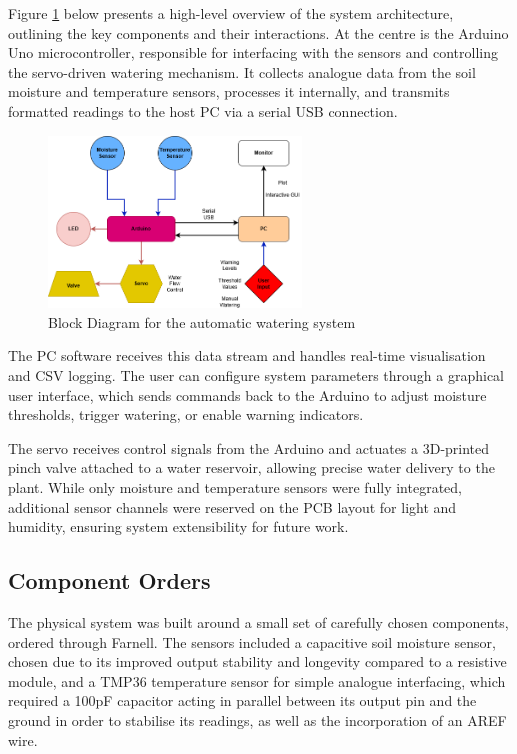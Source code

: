 \documentclass[a4paper,11pt]{article}
\begin{document}
Figure \ref{fig:Block_Diagram_for_the_automatic_watering_system} below presents a high-level overview 
of the system architecture, outlining the key components and their interactions. 
At the centre is the Arduino Uno microcontroller, responsible for interfacing with 
the sensors and controlling the servo-driven watering mechanism. 
It collects analogue data from the soil moisture and temperature sensors, 
processes it internally, and transmits formatted readings 
to the host PC via a serial USB connection.

\begin{figure}[H]
    \centering
    \includegraphics[width=0.6\textwidth]{Datalogger Block Diagram - final.png}
    \caption{Block Diagram for the automatic watering system}
    \label{fig:Block_Diagram_for_the_automatic_watering_system}
\end{figure}

The PC software receives this data stream and handles real-time visualisation
and CSV logging.
The user can configure system parameters through a graphical user interface, 
which sends commands back to the Arduino to adjust moisture thresholds, 
trigger watering, or enable warning indicators.

The servo receives control signals from the Arduino and 
actuates a 3D-printed pinch valve attached to a water reservoir, 
allowing precise water delivery to the plant. 
While only moisture and temperature sensors were fully integrated, 
additional sensor channels were reserved on the PCB layout for light and humidity, 
ensuring system extensibility for future work.

\subsection{Component Orders}
\label{sec:Components}
The physical system was built around a small set of carefully chosen components, 
ordered through Farnell. 
The sensors included a capacitive soil moisture sensor, 
chosen due to its improved output stability and longevity compared to a resistive module,
and a TMP36 temperature sensor for simple analogue interfacing, 
which required a 100pF capacitor acting in parallel between its output pin and the ground
in order to stabilise its readings, 
as well as the incorporation of an AREF wire.
\end{document}
